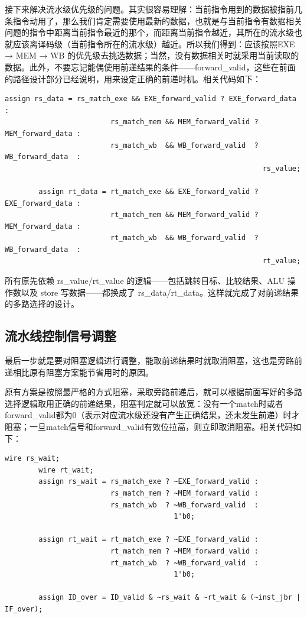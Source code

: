 \documentclass[a4paper]{article}
\begin{document}
	接下来解决流水级优先级的问题。其实很容易理解：当前指令用到的数据被指前几条指令动用了，那么我们肯定需要使用最新的数据，也就是与当前指令有数据相关问题的指令中距离当前指令最近的那个，而距离当前指令越近，其所在的流水级也就应该离译码级（当前指令所在的流水级）越近。所以我们得到：应该按照EXE → MEM → WB 的优先级去挑选数据；当然，没有数据相关时就采用当前读取的数据。此外，不要忘记能偶使用前递结果的条件——forward\_valid，这些在前面的路径设计部分已经说明，用来设定正确的前递时机。相关代码如下：
	\begin{lstlisting}[caption={decode.v}]
	    assign rs_data = rs_match_exe && EXE_forward_valid ? EXE_forward_data :
						 rs_match_mem && MEM_forward_valid ? MEM_forward_data :
						 rs_match_wb  && WB_forward_valid  ? WB_forward_data  :
					                                         rs_value;
	
		assign rt_data = rt_match_exe && EXE_forward_valid ? EXE_forward_data :
						 rt_match_mem && MEM_forward_valid ? MEM_forward_data :
						 rt_match_wb  && WB_forward_valid  ? WB_forward_data  :
														     rt_value;   
	\end{lstlisting}
	
	所有原先依赖 rs\_value/rt\_value 的逻辑——包括跳转目标、比较结果、ALU 操作数以及 store 写数据——都换成了 rs\_data/rt\_data。这样就完成了对前递结果的多路选择的设计。
	
	\subsection{流水线控制信号调整}
	最后一步就是要对阻塞逻辑进行调整，能取前递结果时就取消阻塞，这也是旁路前递相比原有阻塞方案能节省用时的原因。
	
	原有方案是按照最严格的方式阻塞，采取旁路前递后，就可以根据前面写好的多路选择逻辑取用正确的前递结果，阻塞判定就可以放宽：没有一个match时或者forward\_valid都为0（表示对应流水级还没有产生正确结果，还未发生前递）时才阻塞；一旦match信号和forward\_valid有效位拉高，则立即取消阻塞。相关代码如下：
	\begin{lstlisting}[caption={decode.v}]
		wire rs_wait;
		wire rt_wait;
		assign rs_wait = rs_match_exe ? ~EXE_forward_valid :
						 rs_match_mem ? ~MEM_forward_valid :
						 rs_match_wb  ? ~WB_forward_valid  :
										1'b0;
	
		assign rt_wait = rt_match_exe ? ~EXE_forward_valid :
						 rt_match_mem ? ~MEM_forward_valid :
						 rt_match_wb  ? ~WB_forward_valid  :
										1'b0;
										
		assign ID_over = ID_valid & ~rs_wait & ~rt_wait & (~inst_jbr | IF_over);
	\end{lstlisting}
	
\end{document}
